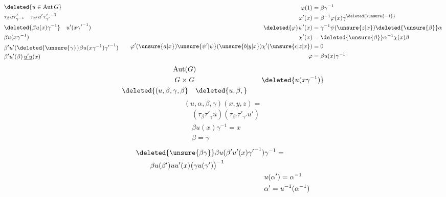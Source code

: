 \[
\begin{aligned}
 &\deleted{u\in\operatorname{Aut}G}\\
 &\tau_\beta u\tau'_{\gamma^{-1}}\quad \tau_{\gamma'}u'\tau'_{\gamma'}{}^{-1}\\
 &\deleted{\beta u(x)\gamma^{-1}}\quad u'(x{\gamma'}^{-1})\\
 &\beta u(x\gamma^{-1})\\
 &\beta'u'(\deleted{\unsure{\gamma}}\beta u(x\gamma^{-1}){\gamma'}^{-1})\\
 &\beta'u'(\beta)\,\underline{u'u}(x)
\end{aligned}\qquad
\begin{aligned}
 \varphi(1)&=\beta\gamma^{-1}\\
 \varphi'(x)&=\beta^{-1}\varphi(x)\gamma^{\deleted{\unsure{-1}}}\\
 \deleted{\varphi}\psi'(x)&=\gamma^{-1}\psi(\unsure{z|x})\deleted{\unsure{\beta}}\alpha\\
 \chi'(x)&=\deleted{\unsure{\beta}}\alpha^{-1}\chi(x)\beta\\
 \varphi'(\unsure{a|x})\unsure{\psi'|\psi}(\unsure{b|y|x})\chi'(\unsure{c|z|x})&=0\\
 \varphi&=\beta u(x)\gamma^{-1}
\end{aligned}
\]
\[
 \begin{gathered}
 \operatorname{Aut}(G)\\G\times G\\
 \deleted{(u,\beta,\gamma,\beta}\quad\deleted{u,\beta,}
 \end{gathered}
 \qquad \deleted{u(x\gamma^{-1})}
\]
\[
 (u,\alpha,\beta,\gamma)(x,y,z)=
\]
\[
 \begin{aligned}
 &(\tau_\beta\tau'_\gamma u)(\tau_{\beta'}\tau'_{\gamma'}u')\\
 &\beta u(x)\gamma^{-1}=x\\
 &\beta=\gamma
 \end{aligned}
\]
\[
\begin{aligned}
 &\deleted{\unsure{\beta\gamma}}\beta u(\beta'u'(x){\gamma'}^{-1})\gamma^{-1}=\\
 &\hspace{2em}\beta u(\beta')uu'(x)\bigl(\gamma u(\gamma')\bigr)^{-1}\\
 &\hspace{18em}u(\alpha')=\alpha^{-1}\\
 &\hspace{18em}\alpha'=u^{-1}(\alpha^{-1})
\end{aligned}
\]
